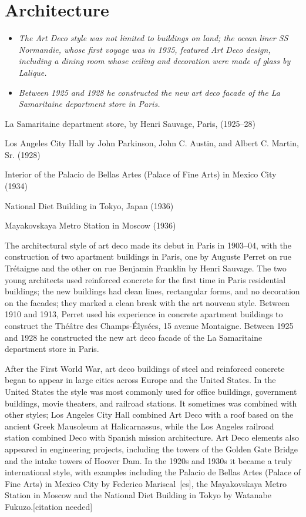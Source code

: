 \section{Architecture}\label{architecture}

\begin{itemize}
\item
  \emph{The Art Deco style was not limited to buildings on land; the
  ocean liner SS Normandie, whose first voyage was in 1935, featured Art
  Deco design, including a dining room whose ceiling and decoration were
  made of glass by Lalique.}
\item
  \emph{Between 1925 and 1928 he constructed the new art deco facade of
  the La Samaritaine department store in Paris.}
\end{itemize}

La Samaritaine department store, by Henri Sauvage, Paris, (1925--28)

Los Angeles City Hall by John Parkinson, John C. Austin, and Albert C.
Martin, Sr. (1928)

Interior of the Palacio de Bellas Artes (Palace of Fine Arts) in Mexico
City (1934)

National Diet Building in Tokyo, Japan (1936)

Mayakovskaya Metro Station in Moscow (1936)

The architectural style of art deco made its debut in Paris in 1903--04,
with the construction of two apartment buildings in Paris, one by
Auguste Perret on rue Trétaigne and the other on rue Benjamin Franklin
by Henri Sauvage. The two young architects used reinforced concrete for
the first time in Paris residential buildings; the new buildings had
clean lines, rectangular forms, and no decoration on the facades; they
marked a clean break with the art nouveau style. Between 1910 and 1913,
Perret used his experience in concrete apartment buildings to construct
the Théâtre des Champs-Élysées, 15 avenue Montaigne. Between 1925 and
1928 he constructed the new art deco facade of the La Samaritaine
department store in Paris.

After the First World War, art deco buildings of steel and reinforced
concrete began to appear in large cities across Europe and the United
States. In the United States the style was most commonly used for office
buildings, government buildings, movie theaters, and railroad stations.
It sometimes was combined with other styles; Los Angeles City Hall
combined Art Deco with a roof based on the ancient Greek Mausoleum at
Halicarnassus, while the Los Angeles railroad station combined Deco with
Spanish mission architecture. Art Deco elements also appeared in
engineering projects, including the towers of the Golden Gate Bridge and
the intake towers of Hoover Dam. In the 1920s and 1930s it became a
truly international style, with examples including the Palacio de Bellas
Artes (Palace of Fine Arts) in Mexico City by Federico
Mariscal~{[}es{]}, the Mayakovskaya Metro Station in Moscow and the
National Diet Building in Tokyo by Watanabe Fukuzo.{[}citation needed{]}


